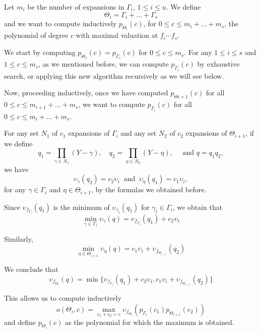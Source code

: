 \documentclass[a4paper,11pt]{amsart}%
\theoremstyle{definition}
\theoremstyle{plain}
\theoremstyle{remark}
\begin{document}
Let $m_{i}$ be the number of expansions in $\Gamma_{i}$, $1 \leq i \leq
u$. We define
$$\Theta_{i} = \Gamma_{i} + \dots + \Gamma_{s}$$
 and we
want to compute inductively $p_{\Theta_{i}}(c)$, for $0 \leq c \leq m_{i} +
\dots+ m_{s}$, the polynomial of degree $c$ with maximal valuation at $f_i \cdots f_s$.

We start by computing $p_{\Theta_{s}}(c) = p_{\Gamma_{s}}(c)$ for $0
\leq c \leq m_{s}$. For any $1 \leq i \leq s$ and $1 \leq c \leq m_{s}$, as we mentioned before, we can
compute $p_{\Gamma_{i}}(c)$ by exhaustive search, or applying this new algorithm recursively as we will see below.

Now, proceeding inductively, once we have computed $p_{\Theta{i+1}}(c)$ for
all $0 \leq c \leq m_{i+1} + \dots+ m_{s}$, we want to compute
$p_{\Gamma_{i}}(c)$ for all $0 \leq c \leq m_{i} + \dots+ m_{s}$.

For any set $N_{1}$ of $c_{1}$ expansions of $\Gamma_{i}$ and any
set $N_{2}$ of $c_{2}$ expansions of $\Theta_{i+1}$, if we define
$$
q_{1} = \prod_{\gamma\in N_{1}}(Y - \gamma), \quad
q_{2} = \prod_{\eta\in N_{2}}(Y - \eta), \quad
\text{ and } q = q_{1}q_{2},$$
we have
\[
\upsilon_{\gamma}(q_{2}) = c_{2} \upsilon_i \ \text{ and } \ \upsilon_{\eta}(q_{1}) = c_{1} \upsilon_i,
\]
for any $\gamma \in \Gamma_i$ and $\eta \in \Theta_{i+1}$, by the formulas we obtained before.


Since $\upsilon_{f_{\Gamma_{i}}}(q_{1})$ is the minimum of $\upsilon_{\gamma_{i}}%
(q_{1})$ for $\gamma_{i} \in\Gamma_{i}$, we obtain that
\[
\min_{\gamma\in\Gamma_{i}} \upsilon_{\gamma}(q) = \upsilon_{f_{\Gamma_{i}}}(q_{1}) +
c_{2} \upsilon_i
\]


Similarly,
\[
\min_{\eta\in\Theta_{i+1}} \upsilon_{\eta}(q) = c_{1} \upsilon_i +
\upsilon_{f_{\Theta_{i+1}}}(q_{2})
\]


We conclude that
\[\boxed{
\upsilon_{f_{\Theta_{i}}}(q) = \min\{\upsilon_{f_{\Gamma_{i}}}(q_{1}) + c_{2} \upsilon_i,
c_{1} \upsilon_i + \upsilon_{f_{\Theta_{i+1}}}(q_{2})\}}
\]


This allows us to compute inductively
\[
o(\Theta_{i}, c) = \max_{c_{1} + c_{2} = c} \upsilon_{f_{\Theta_{i}}%
}(p_{\Gamma_{i}}(c_{1})p_{\Theta_{i+1}}(c_{2}))
\]
and define $p_{\Theta_{i}}(c)$ as the polynomial for which the maximum is obtained.

\end{document}
